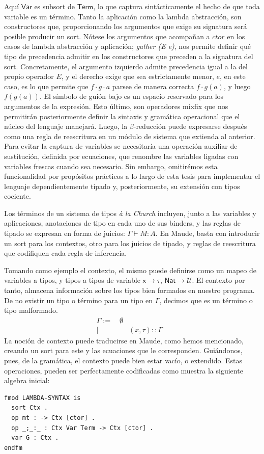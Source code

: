 Aquí $\mathsf{Var}$ es subsort de $\mathsf{Term}$, lo que captura sintácticamente el hecho de que toda variable es un término. Tanto la aplicación como la lambda abstracción, son constructores que, proporcionando los argumentos que exige su signatura será posible producir un sort. Nótese los argumentos que acompañan a $ctor$ en los casos de lambda abstracción y aplicación; \textit{gather (E e)}, nos permite definir qué tipo de precedencia admitir en los constructores que preceden a la signatura del sort. Concretamente, el argumento izquierdo admite precedencia igual a la del propio operador $E$, y el derecho exige que sea estrictamente menor, $e$, en este caso, es lo que permite que $f \cdot g \cdot a$ parsee de manera correcta $f \cdot g(a)$, y luego $f(g(a))$. 
El símbolo de guión bajo es un espacio reservado para los argumentos de la expresión. Esto último, son operadores mixfix que nos permitirán posteriormente definir la sintaxis y gramática operacional que el núcleo del lenguaje manejará. Luego, la $\beta$-reducción puede expresarse después como una regla de reescritura en un módulo de sistema que extienda al anterior. Para evitar la captura de variables se necesitaría una operación auxiliar de sustitución, definida por ecuaciones, que renombre las variables ligadas con variables frescas cuando sea necesario. Sin embargo, omitirémos esta funcionalidad por propósitos prácticos a lo largo de esta tesis para implementar el lenguaje dependientemente tipado y, posteriormente, su extensión con tipos cociente.

Los términos de un sistema de tipos \textit{à la Church} incluyen, junto a las variables y aplicaciones, anotaciones de tipo en cada uno de sus binders, y las reglas de tipado se expresan en forma de juicios: $\Gamma \vdash M : A$. En Maude, basta con introducir un sort para los contextos, otro para los juicios de tipado, y reglas de reescritura que codifiquen cada regla de inferencia.

Tomando como ejemplo el contexto, el mismo puede definirse como un mapeo de variables a tipos, y tipos a tipos de variable $\mathsf{x \to \tau}$, $\mathsf{Nat \to \mathcal{U}}$. El contexto por tanto, almacena información sobre los tipos bien formados en nuestro programa. De no existir un tipo o término para un tipo en $\Gamma$, decimos que es un término o tipo malformado.
\begin{align}
  \Gamma := \quad \emptyset \\
  \mid \quad & (x, \tau) :: \Gamma &
\end{align}
La noción de contexto puede traducirse en Maude, como hemos mencionado, creando un sort para este y las ecuaciones que le corresponden. Guiándonos, pues, de la gramática, el contexto puede bien estar vacío, o extendido. Estas operaciones, pueden ser perfectamente codificadas como muestra la siguiente algebra inicial:
\begin{lstlisting}
fmod LAMBDA-SYNTAX is
  sort Ctx .
  op mt : -> Ctx [ctor] .
  op _;_:_ : Ctx Var Term -> Ctx [ctor] .
  var G : Ctx .
endfm
\end{lstlisting}

